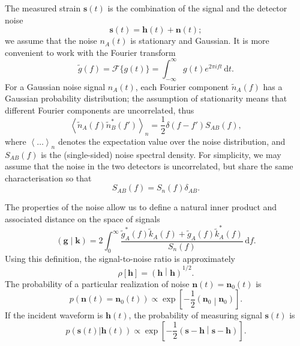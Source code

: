\documentclass[useAMS,usedcolumn,usegraphicx,usenatbib]{mn2e}
\newcommand{\dd}{\ensuremath{\mathrm{d}}}
\newcommand{\intd}[4]{\ensuremath{\int_{#1}^{#2}{#3}\,\dd{#4}}}
\newcommand{\recip}[1]{\ensuremath{\frac{1}{#1}}}
\newcommand{\innerprod}[2]{\ensuremath{\left({#1}\middle|{#2}\right)}}
\begin{document}
The measured strain $\boldsymbol{s}(t)$ is the combination of the signal and the detector noise
\begin{equation}
\boldsymbol{s}(t) = \boldsymbol{h}(t) + \boldsymbol{n}(t);
\end{equation}
we assume that the noise $n_A(t)$ is stationary and Gaussian. It is more convenient to work with the Fourier transform
\begin{equation}
\tilde{g}(f) = \mathscr{F}\{g(t)\} = \intd{-\infty}{\infty}{g(t)e^{2\pi i ft}}{t}.
\end{equation}
For a Gaussian noise signal $n_A(t)$, each Fourier component $\tilde{n}_A(f)$ has a Gaussian probability distribution; the assumption of stationarity means that different Fourier components are uncorrelated, thus \citep{Cutler1994}
\begin{equation}
\left\langle\tilde{n}_A(f)\tilde{n}_B^*(f')\right\rangle_n = \recip{2}\delta(f - f')S_{AB}(f),
\end{equation}
where $\left\langle\ldots\right\rangle_n$ denotes the expectation value over the noise distribution, and $S_{AB}(f)$ is the (single-sided) noise spectral density. For simplicity, we may assume that the noise in the two detectors is uncorrelated, but share the same characterisation so that \citep{Cutler1998}
\begin{equation}
S_{AB}(f) = S_n(f)\delta_{AB}.
\end{equation}

The properties of the noise allow us to define a natural inner product and associated distance on the space of signals \citep{Cutler1994}
\begin{equation}
\innerprod{\boldsymbol{g}}{\boldsymbol{k}} = 2\intd{0}{\infty}{\frac{\tilde{g}_A^\ast(f)\tilde{k}_A(f) + \tilde{g}_A(f)\tilde{k}_A^\ast(f)}{S_n(f)}}{f}.
\label{eq:inner}
\end{equation}
Using this definition, the signal-to-noise ratio is approximately
\begin{equation}
\rho[\boldsymbol{h}] = \innerprod{\boldsymbol{h}}{\boldsymbol{h}}^{1/2}.
\label{eq:SNR}
\end{equation}
The probability of a particular realization of noise $\boldsymbol{n}(t) = \boldsymbol{n}_0(t)$ is
\begin{equation}
p(\boldsymbol{n}(t) = \boldsymbol{n}_0(t)) \propto \exp\left[-\recip{2}\innerprod{\boldsymbol{n}_0}{\boldsymbol{n}_0}\right].
\end{equation}
If the incident waveform is $\boldsymbol{h}(t)$, the probability of measuring signal $\boldsymbol{s}(t)$ is
\begin{equation}
p(\boldsymbol{s}(t)|\boldsymbol{h}(t)) \propto \exp\left[-\recip{2}\innerprod{\boldsymbol{s}-\boldsymbol{h}}{\boldsymbol{s}-\boldsymbol{h}}\right].
\label{eq:sig_prob}
\end{equation}
\end{document}
